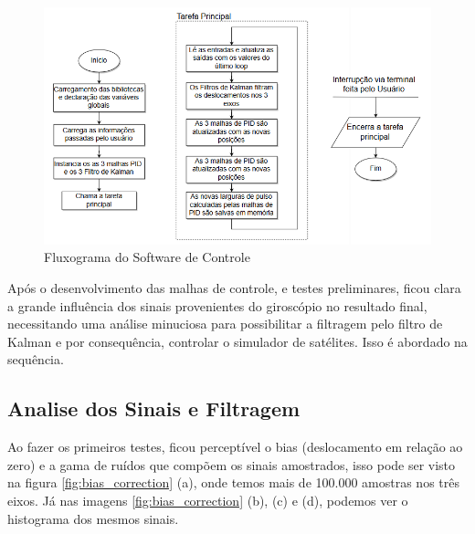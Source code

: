 \begin{figure}[H]
  \caption{Fluxograma do Software de Controle}
  \begin{center}
      \includegraphics[scale=.75]{metodologia/img/software_model}
  \end{center}
  \label{fig:software_model}
\end{figure}

Após o desenvolvimento das malhas de controle, e testes preliminares, ficou clara a grande influência dos sinais provenientes do giroscópio no resultado final, necessitando uma análise minuciosa para possibilitar a filtragem pelo filtro de Kalman e por consequência, controlar o simulador de satélites. Isso é abordado na sequência. 


\subsection{Analise dos Sinais e Filtragem}

Ao fazer os primeiros testes, ficou perceptível o bias (deslocamento em relação ao zero) e a gama de ruídos que compõem os sinais amostrados, isso pode ser visto na figura \ref{fig:bias_correction} (a), onde temos mais de 100.000 amostras nos três eixos. Já nas imagens \ref{fig:bias_correction} (b), (c) e (d), podemos ver o histograma dos mesmos sinais.

